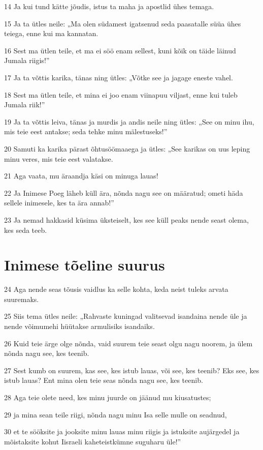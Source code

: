 \par 14 Ja kui tund kätte jõudis, istus ta maha ja apostlid ühes temaga.
\par 15 Ja ta ütles neile: „Ma olen südamest igatsenud seda paasatalle süüa ühes teiega, enne kui ma kannatan.
\par 16 Sest ma ütlen teile, et ma ei söö enam sellest, kuni kõik on täide läinud Jumala riigis!”
\par 17 Ja ta võttis karika, tänas ning ütles: „Võtke see ja jagage eneste vahel.
\par 18 Sest ma ütlen teile, et mina ei joo enam viinapuu viljast, enne kui tuleb Jumala riik!”
\par 19 Ja ta võttis leiva, tänas ja murdis ja andis neile ning ütles: „See on minu ihu, mis teie eest antakse; seda tehke minu mälestuseks!”
\par 20 Samuti ka karika pärast õhtusöömaaega ja ütles: „See karikas on uus leping minu veres, mis teie eest valatakse.
\par 21 Aga vaata, mu äraandja käsi on minuga lauas!
\par 22 Ja Inimese Poeg läheb küll ära, nõnda nagu see on määratud; ometi häda sellele inimesele, kes ta ära annab!”
\par 23 Ja nemad hakkasid küsima üksteiselt, kes see küll peaks nende seast olema, kes seda teeb.

\section*{Inimese tõeline suurus}

\par 24 Aga nende seas tõusis vaidlus ka selle kohta, keda neist tuleks arvata suuremaks.
\par 25 Siis tema ütles neile: „Rahvaste kuningad valitsevad isandaina nende üle ja nende võimumehi hüütakse armulisiks isandaiks.
\par 26 Kuid teie ärge olge nõnda, vaid suurem teie seast olgu nagu noorem, ja ülem nõnda nagu see, kes teenib.
\par 27 Sest kumb on suurem, kas see, kes istub lauas, või see, kes teenib? Eks see, kes istub lauas? Ent mina olen teie seas nõnda nagu see, kes teenib.
\par 28 Aga teie olete need, kes minu juurde on jäänud mu kiusatustes;
\par 29 ja mina sean teile riigi, nõnda nagu minu Isa selle mulle on seadnud,
\par 30 et te sööksite ja jooksite minu lauas minu riigis ja istuksite aujärgedel ja mõistaksite kohut Iisraeli kaheteistkümne suguharu üle!”

